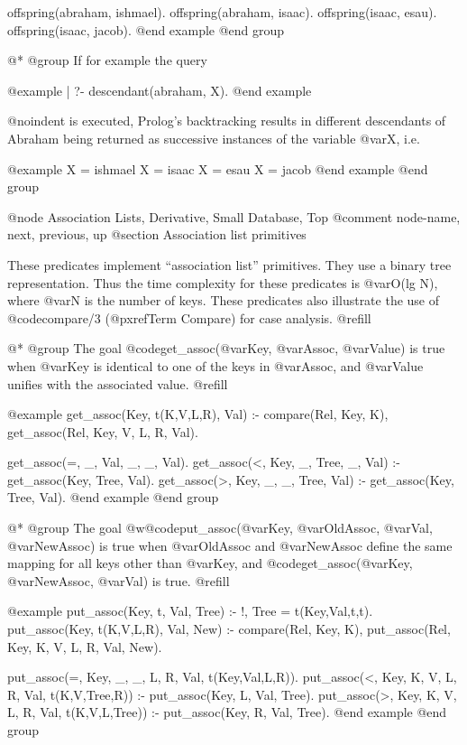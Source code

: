 {{{{{offspring(abraham, ishmael).
offspring(abraham, isaac).
offspring(isaac, esau).
offspring(isaac, jacob).
@end example
@end group

 @*
@group
If for example the query

@example
| ?- descendant(abraham, X).
@end example

@noindent
is executed, Prolog's backtracking results in different descendants of
Abraham being returned as successive instances of the variable @var{X},
i.e.

@example
X = ishmael
X = isaac
X = esau
X = jacob
@end example
@end group

@node Association Lists, Derivative, Small Database, Top
@comment  node-name,  next,  previous,  up
@section Association list primitives

These predicates implement ``association list'' primitives.  They use a
binary tree representation.  Thus the time complexity for these
predicates is @var{O(lg N)}, where @var{N} is the number of keys.  These
predicates also illustrate the use of @code{compare/3} (@pxref{Term
Compare}) for case analysis. @refill

 @*
@group
The goal @code{get_assoc(@var{Key}, @var{Assoc}, @var{Value})} is true
when @var{Key} is identical to one of the keys in @var{Assoc}, and
@var{Value} unifies with the associated value. @refill

@example
get_assoc(Key, t(K,V,L,R), Val) :-
        compare(Rel, Key, K),
        get_assoc(Rel, Key, V, L, R, Val).

get_assoc(=, _, Val, _, _, Val).
get_assoc(<, Key, _, Tree, _, Val) :-
        get_assoc(Key, Tree, Val).
get_assoc(>, Key, _, _, Tree, Val) :-
        get_assoc(Key, Tree, Val).
@end example
@end group

 @*
@group
The goal @w{@code{put_assoc(@var{Key}, @var{OldAssoc}, @var{Val}, @var{NewAssoc})}} 
is true when @var{OldAssoc} and @var{NewAssoc} define the same mapping
for all keys other than @var{Key}, and @code{get_assoc(@var{Key},
@var{NewAssoc}, @var{Val})} is true. @refill

@example
put_assoc(Key, t, Val, Tree) :- !, Tree = t(Key,Val,t,t).
put_assoc(Key, t(K,V,L,R), Val, New) :-
        compare(Rel, Key, K),
        put_assoc(Rel, Key, K, V, L, R, Val, New).

put_assoc(=, Key, _, _, L, R, Val, t(Key,Val,L,R)).
put_assoc(<, Key, K, V, L, R, Val, t(K,V,Tree,R)) :-
        put_assoc(Key, L, Val, Tree).
put_assoc(>, Key, K, V, L, R, Val, t(K,V,L,Tree)) :-
        put_assoc(Key, R, Val, Tree).
@end example
@end group

}}}}}

